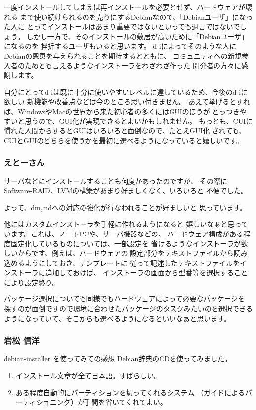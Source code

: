 \documentclass[mingoth]{jsarticle}
\begin{document}
一度インストールしてしまえば再インストールを必要とせず、ハードウェアが壊れる
まで使い続けられるのを売りにするDebianなので、「Debianユーザ」になった人に
とってインストールはあまり重要ではないといっても過言ではないでしょう。
しかし一方で、そのインストールの敷居が高いために「Debianユーザ」になるのを
挫折するユーザもいると思います。
d-iによってそのような人にDebianの恩恵を与えられることを期待するとともに、
コミュニティへの新規参入者のためとも言えるようなインストーラをわざわざ作った
開発者の方々に感謝します。

自分にとってd-iは既に十分に使いやすいレベルに達しているため、今後のd-iに欲しい
新機能や改善点などは今のところ思い付きません。
あえて挙げるとすれば、WindowsやMacの世界から来た初心者の多くにはGUIのほうが
とっつきやすいと思うので、GUI化が実現できるとよいかもしれません。
もっとも、CUIに慣れた人間からするとGUIはいろいろと面倒なので、たとえGUI化
されても、CUIとGUIのどちらを使うかを最初に選べるようになっていると嬉しいです。

\subsubsection{えとーさん}

  サーバなどにインストールすることも何度かあったのですが、
その際にSoftware-RAID、LVMの構築があまり好ましくなく、いろいろと
不便でした。

  よって、dm,mdへの対応の強化が行なわれることが好ましいと
思っています。

  他にはカスタムインストーラを手軽に作れるようになると
嬉しいなぁと思っています。これは、ノートPCや、サーバ機器などの、
ハードウェア構成がある程度固定化しているものについては、一部設定を
省けるようなインストーラが欲しいからです、例えば、ハードウェアの
設定部分をテキストファイルから読み込めるようにしておき、テンプレートに
従って記述したテキストファイルをインストーラに追加しておけば、
インストーラの画面から型番等を選択することにより設定終り。

  パッケージ選択についても同様でもハードウェアによって必要なパッケージを
探すのが面倒ですので環境に合わせたパッケージのタスクみたいのを選択できる
ようになっていて、そこからも選べるようになるといいなぁと思います。

\subsubsection{岩松 信洋}
debian-installer を使ってみての感想
	Debian辞典のCDを使ってみました。


\begin{enumerate}
 \item インストール文章が全て日本語。すばらしい。
 \item ある程度自動的にパーティションを切ってくれるシステム
	  （ガイドによるパーティショニング）が手間を省いてくれてよい。
\end{enumerate}	
\end{document}
